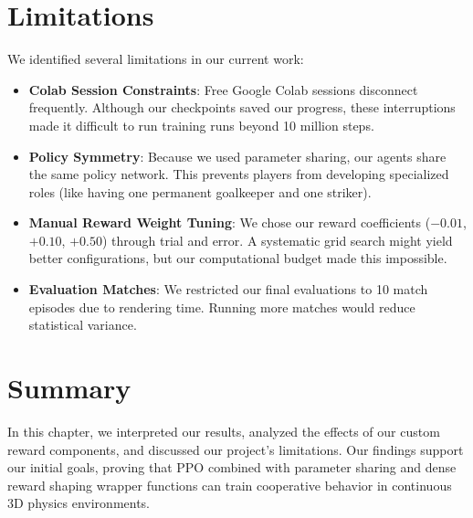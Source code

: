 \section{Limitations}
\label{sec:limitations}

We identified several limitations in our current work:
\begin{itemize}
    \item \textbf{Colab Session Constraints}: Free Google Colab sessions disconnect frequently. Although our checkpoints saved our progress, these interruptions made it difficult to run training runs beyond 10 million steps.
    \item \textbf{Policy Symmetry}: Because we used parameter sharing, our agents share the same policy network. This prevents players from developing specialized roles (like having one permanent goalkeeper and one striker).
    \item \textbf{Manual Reward Weight Tuning}: We chose our reward coefficients ($-0.01$, $+0.10$, $+0.50$) through trial and error. A systematic grid search might yield better configurations, but our computational budget made this impossible.
    \item \textbf{Evaluation Matches}: We restricted our final evaluations to 10 match episodes due to rendering time. Running more matches would reduce statistical variance.
\end{itemize}

\section{Summary}
\label{sec:discussion-summary}

In this chapter, we interpreted our results, analyzed the effects of our custom reward components, and discussed our project's limitations. Our findings support our initial goals, proving that PPO combined with parameter sharing and dense reward shaping wrapper functions can train cooperative behavior in continuous 3D physics environments.